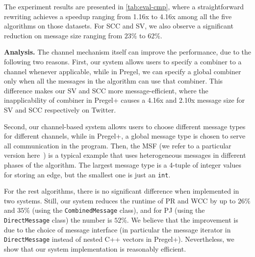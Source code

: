\documentclass{sokendai_thesis} %
\newcommand{\CC}{C++}
\newcommand{\PP}{Pregel+}
\begin{document}
The experiment results are presented in \autoref{tab:eval-cmp}, where a straightforward rewriting achieves a speedup ranging from 1.16x to 4.16x among all the five algorithms on those datasets.
For SCC and SV, we also observe a significant reduction on message size ranging from $23\%$ to $62\%$.

\textbf{Analysis.}
The channel mechanism itself can improve the performance, due to the following two reasons.
First, our system allows users to specify a combiner to a channel whenever applicable, %
while in Pregel, we can specify a global combiner only when all the messages in the algorithm can use that combiner.
This difference makes our SV and SCC more message-efficient,
where the inapplicability of combiner in \PP{} causes a 4.16x and 2.10x message size for SV and SCC respectively on Twitter.

Second, our channel-based system allows users to choose different message types for different channels, while in \PP{}, a global message type is chosen to serve all communication in the program.
Then, the MSF (we refer to a particular version here~\cite{boruvka}) is a typical example that uses heterogeneous messages in different phases of the algorithm.
The largest message type is a 4-tuple of integer values for storing an edge, but the smallest one is just an \texttt{int}.

For the rest algorithms, there is no significant difference when implemented in two systems.
Still, our system reduces the runtime of PR and WCC by up to $26\%$ and $35\%$ (using the \texttt{CombinedMessage} class), and for PJ (using the \texttt{DirectMessage} class) the number is $52\%$.
We believe that the improvement is due to the choice of message interface (in particular the message iterator in \texttt{DirectMessage} instead of nested \CC{} vectors in \PP{}).
Nevertheless, we show that our system implementation is reasonably efficient.
\end{document}
